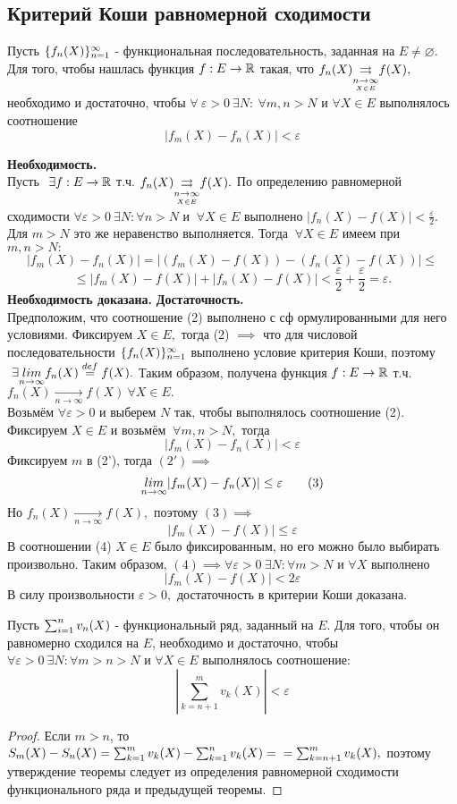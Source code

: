\documentclass[main]{subfiles}
\begin{document}
\subsection{Критерий Коши равномерной сходимости}
\begin{theorem}
     Пусть $\fnn[f_n(X)]$ - функциональная последовательность, заданная на $E\neq\varnothing.$ 
     Для того, чтобы нашлась функция $f: E\to {\vR}$ такая, что 
     $f_n(X){\darrow{\underset{X\in E}{n\to\infty}}}  f(X),$
      необходимо и достаточно, чтобы $\forall\ \varepsilon>0\ \exists N:\ \forall m, n>N$ и 
      $\forall X\in E$ выполнялось соотношение 
\[ |f_m(X)-f_n(X)|<\varepsilon\tag{2} \] \end{theorem}
\begin{longProof} \textbf{Необходимость.} \\
     Пусть $\ \exists f:E\to{\vR}$ т.ч. $f_n(X){\darrow{\underset{X\in E}{n\to\infty}}}  f(X).$ 
     По определению равномерной сходимости $\forall \varepsilon>0 \ \exists N: \forall n>N$ и $\ \forall X\in E$
      выполнено $|f_n(X)-f(X)|<\frac{\varepsilon}{2}$. Для $m>N$ это же неравенство выполняется.
       Тогда $\ \forall X\in E$ имеем при $m,n>N:$ \[ |f_m(X)-f_n(X)|=|(f_m(X)-f(X))-(f_n(X)-f(X))|\leq\] 
       \[\leq|f_m(X)-f(X)|+|f_n(X)-f(X)|<\frac{\varepsilon}{2}+\frac{\varepsilon}{2}=\varepsilon. \] 
       \textbf{Необходимость доказана.}
\textbf{Достаточность.} \\
Предположим, что соотношение (2) выполнено с сф ормулированными для него условиями. 
Фиксируем $X\in E,$ тогда (2) $\implies$ что для числовой последовательности $\fnn[f_n(X)]$ выполнено условие критерия Коши, поэтому $\ \exists \Lim f_n(X)\overset{def}{=}f(X).$ Таким образом, получена функция $f:E\to {\vR}$ т.ч. $f_n(X)\underset{n\to\infty}{\to} f(X)\ \forall X\in E.$\\
Возьмём $\forall \varepsilon>0$ и выберем $N$ так, чтобы выполнялось соотношение (2). 
Фиксируем $X\in E$ и возьмём $\ \forall m, n>N,$ тогда \[ |f_m(X)-f_n(X)|<\varepsilon \tag{2'} \]
Фиксируем $m$ в (2'), тогда $(2')\implies$ 
\[\Lim |f_m(X)-f_n(X)|\leq\varepsilon\tag{3} \]
Но $f_n(X)\underset{n\to \infty}{\to}f(X),$ поэтому $(3)\implies$
 \[|f_m(X)-f(X)|\leq\varepsilon \tag{4}\]
В соотношении (4) $X\in E$ было фиксированным, но его можно было выбирать произвольно. Таким образом, $(4) \implies \forall\varepsilon>0\ \exists N: \forall m>N$ и $\forall X$ выполнено \[ |f_m(X)-f(X)|<2\varepsilon \]
В силу произвольности $\varepsilon>0,$ достаточность в критерии Коши доказана.
\end{longProof}
\begin{theorem} 
    Пусть $\sumn v_n(X)$ - функциональный ряд, заданный на $E$. Для того, чтобы он равномерно сходился на $E$,
     необходимо и достаточно, чтобы $\forall \varepsilon>0\ \exists N: \forall m>n>N$ 
     и $\forall X\in E$ выполнялось соотношение: \[ |\sum_{k=n+1}^m v_k(X)|<\varepsilon\tag{5} \]
\end{theorem}
\begin{proof}
     Если $m>n$, то $S_m(X)-S_n(X)=\sum_{k=1}^m v_k(X)-\sum_{k=1}^n
 v_k(X)=\\=\sum_{k=n+1}^m v_k(X),$ поэтому утверждение теоремы следует из 
 определения равномерной сходимости функционального ряда и предыдущей теоремы.
\end{proof}
\end{document}
